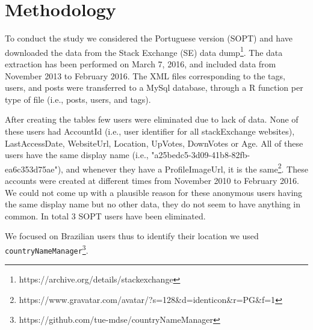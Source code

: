 \section{Methodology}
\noindent To conduct the study we considered the Portuguese version (SOPT) and have downloaded the data from the Stack Exchange (SE) data dump\footnote{https://archive.org/details/stackexchange}. The data extraction has been performed on March 7, 2016, and included data from November 2013 to February 2016. The XML files corresponding to the tags, users, and posts were transferred to a MySql database, through a R function per type of file (i.e., posts, users, and tags). 

After creating the tables few users were eliminated due to lack of data. None of these users had AccountId (i.e., user identifier for all stackExchange websites), LastAccessDate, WebsiteUrl, Location, UpVotes, DownVotes or Age. All of these users have the same display name (i.e., "a25bedc5-3d09-41b8-82fb-ea6c353d75ae"), and whenever they have a ProfileImageUrl, it is the same\footnote{https://www.gravatar.com/avatar/?s=128\&d=identicon\&r=PG\&f=1}.
These accounts were created at different times from November 2010 to February 2016. We could not come up with a plausible reason for these anonymous users having the same display name but no other data, they do not seem to have anything in common. In total 3 SOPT users have been eliminated.

We focused on Brazilian users thus to identify their location we used \texttt{countryNameManager}\footnote{https://github.com/tue-mdse/countryNameManager}. 

